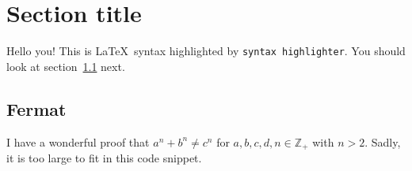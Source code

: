 \documentclass{article}
\newcommand\hi[1]{Hello #1!}
\begin{document}
\section{Section title}

\hi{you}
This is \LaTeX\ syntax highlighted by \verb|syntax highlighter|.
You should look at section~\ref{sec:fermat} next.

\subsection{Fermat}\label{sec:fermat}

I have a wonderful proof that $a^n + b^n \neq c^n$
for \(a, b, c, d, n \in \mathbb{Z}_+\) with \(n > 2\).
Sadly, it is too large to fit in this code snippet.
\end{document}
